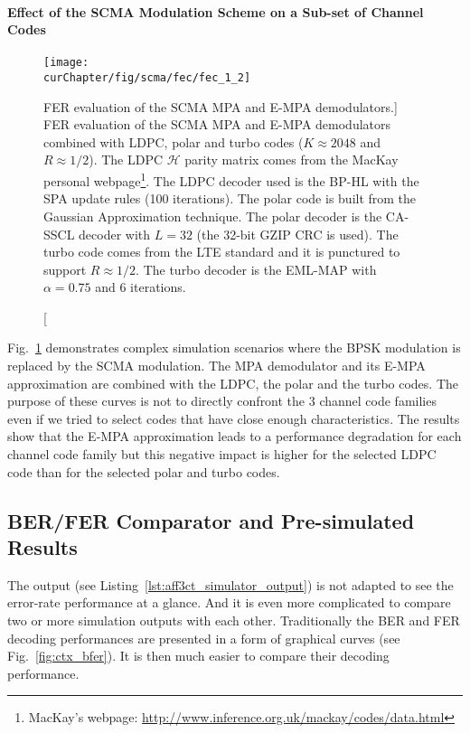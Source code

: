 \paragraph{Effect of the SCMA Modulation Scheme on a Sub-set of Channel Codes}

\begin{figure}[htp]
  \centering
  \texttt{[image: \\curChapter/fig/scma/fec/fec\_1\_2]}
  \caption
    [FER evaluation of the SCMA MPA and E-MPA demodulators.]
    {FER evaluation of the SCMA MPA and E-MPA demodulators combined with LDPC,
     polar and turbo codes ($K \approx 2048$ and $R \approx 1/2$).
     The LDPC $\mathcal{H}$ parity matrix comes from the MacKay personal
     webpage\footnote{MacKay's webpage: \url{http://www.inference.org.uk/mackay/codes/data.html}}.
     The LDPC decoder used is the BP-HL with the SPA update rules (100
     iterations). The polar code is built from the Gaussian Approximation
     technique. The polar decoder is the CA-SSCL decoder with $L=32$ (the 32-bit
     GZIP CRC is used). The turbo code comes from the LTE standard and it is
     punctured to support $R \approx 1/2$. The turbo decoder is the EML-MAP with
     $\alpha = 0.75$ and 6 iterations.}
  \label{plot:aff3ct_scma_fec}
\end{figure}

Fig.~\ref{plot:aff3ct_scma_fec} demonstrates complex simulation scenarios where
the BPSK modulation is replaced by the SCMA modulation. The MPA demodulator and
its E-MPA approximation are combined with the LDPC, the polar and the turbo
codes. The purpose of these curves is not to directly confront the 3 channel
code families even if we tried to select codes that have close enough
characteristics. The results show that the E-MPA approximation leads to a
performance degradation for each channel code family but this negative impact is
higher for the selected LDPC code than for the selected polar and turbo codes.

\subsection{BER/FER Comparator and Pre-simulated Results}

The \AFFECT output (see Listing~\ref{lst:aff3ct_simulator_output}) is not
adapted to see the error-rate performance at a glance. And it is even more
complicated to compare two or more simulation outputs with each other.
Traditionally the BER and FER decoding performances are presented in a form of
graphical curves (see Fig.~\ref{fig:ctx_bfer}). It is then much easier to
compare their decoding performance.

